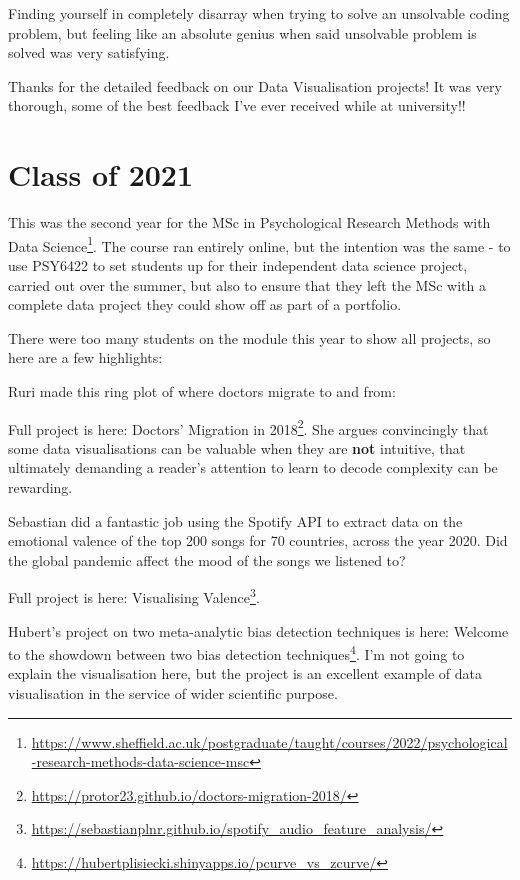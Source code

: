 \documentclass[
  12pt,
  a5paper,
]{book}
\DeclareRobustCommand{\href}[2]{#2\footnote{\url{#1}}}
\begin{document}
Finding yourself in completely disarray when trying to solve an unsolvable coding problem, but feeling like an absolute genius when said unsolvable problem is solved was very satisfying.

Thanks for the detailed feedback on our Data Visualisation projects! It was very thorough, some of the best feedback I've ever received while at university!!

\hypertarget{class-of-2021}{%
\chapter{Class of 2021}\label{class-of-2021}}

This was the second year for the \href{https://www.sheffield.ac.uk/postgraduate/taught/courses/2022/psychological-research-methods-data-science-msc}{MSc in Psychological Research Methods with Data Science}. The course ran entirely online, but the intention was the same - to use PSY6422 to set students up for their independent data science project, carried out over the summer, but also to ensure that they left the MSc with a complete data project they could show off as part of a portfolio.

There were too many students on the module this year to show all projects, so here are a few highlights:

Ruri made this ring plot of where doctors migrate to and from:

Full project is here: \href{https://protor23.github.io/doctors-migration-2018/}{Doctors' Migration in 2018}. She argues convincingly that some data visualisations can be valuable when they are \textbf{not} intuitive, that ultimately demanding a reader's attention to learn to decode complexity can be rewarding.

Sebastian did a fantastic job using the Spotify API to extract data on the emotional valence of the top 200 songs for 70 countries, across the year 2020. Did the global pandemic affect the mood of the songs we listened to?

Full project is here: \href{https://sebastianplnr.github.io/spotify_audio_feature_analysis/}{Visualising Valence}.

Hubert's project on two meta-analytic bias detection techniques is here: \href{https://hubertplisiecki.shinyapps.io/pcurve_vs_zcurve/}{Welcome to the showdown between two
bias detection techniques}. I'm not going to explain the visualisation here, but the project is an excellent example of data visualisation in the service of wider scientific purpose.
\end{document}
